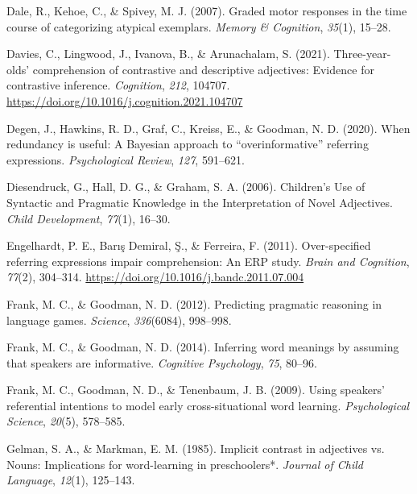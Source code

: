 \documentclass[
  english,
  man,floatsintext]{apa6}
\newlength{\cslhangindent}
\newenvironment{cslreferences}%
  {\setlength{\parindent}{0pt}%
  \everypar{\setlength{\hangindent}{\cslhangindent}}\ignorespaces}%
  {\par}
\begin{document}
\begin{cslreferences}
\leavevmode\hypertarget{ref-dale_graded_2007}{}%
Dale, R., Kehoe, C., \& Spivey, M. J. (2007). Graded motor responses in the time course of categorizing atypical exemplars. \emph{Memory \& Cognition}, \emph{35}(1), 15--28.

\leavevmode\hypertarget{ref-davies_three-year-olds_2021}{}%
Davies, C., Lingwood, J., Ivanova, B., \& Arunachalam, S. (2021). Three-year-olds' comprehension of contrastive and descriptive adjectives: Evidence for contrastive inference. \emph{Cognition}, \emph{212}, 104707. \url{https://doi.org/10.1016/j.cognition.2021.104707}

\leavevmode\hypertarget{ref-degen_when_2020}{}%
Degen, J., Hawkins, R. D., Graf, C., Kreiss, E., \& Goodman, N. D. (2020). When redundancy is useful: A Bayesian approach to ``overinformative'' referring expressions. \emph{Psychological Review}, \emph{127}, 591--621.

\leavevmode\hypertarget{ref-diesendruck_childrens_2006}{}%
Diesendruck, G., Hall, D. G., \& Graham, S. A. (2006). Children's Use of Syntactic and Pragmatic Knowledge in the Interpretation of Novel Adjectives. \emph{Child Development}, \emph{77}(1), 16--30.

\leavevmode\hypertarget{ref-engelhardt_over-specified_2011}{}%
Engelhardt, P. E., Barış Demiral, Ş., \& Ferreira, F. (2011). Over-specified referring expressions impair comprehension: An ERP study. \emph{Brain and Cognition}, \emph{77}(2), 304--314. \url{https://doi.org/10.1016/j.bandc.2011.07.004}

\leavevmode\hypertarget{ref-frank2012}{}%
Frank, M. C., \& Goodman, N. D. (2012). Predicting pragmatic reasoning in language games. \emph{Science}, \emph{336}(6084), 998--998.

\leavevmode\hypertarget{ref-frank2014}{}%
Frank, M. C., \& Goodman, N. D. (2014). Inferring word meanings by assuming that speakers are informative. \emph{Cognitive Psychology}, \emph{75}, 80--96.

\leavevmode\hypertarget{ref-frank2009}{}%
Frank, M. C., Goodman, N. D., \& Tenenbaum, J. B. (2009). Using speakers' referential intentions to model early cross-situational word learning. \emph{Psychological Science}, \emph{20}(5), 578--585.

\leavevmode\hypertarget{ref-gelman_implicit_1985}{}%
Gelman, S. A., \& Markman, E. M. (1985). Implicit contrast in adjectives vs. Nouns: Implications for word-learning in preschoolers*. \emph{Journal of Child Language}, \emph{12}(1), 125--143.


\end{cslreferences}
\end{document}
